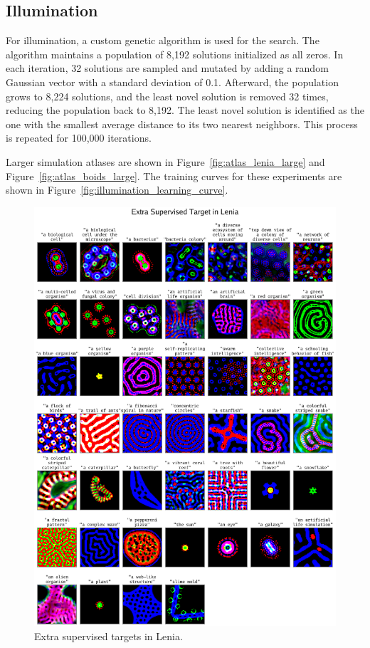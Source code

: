 \documentclass{article}
\begin{document}
\subsection{Illumination}

For illumination, a custom genetic algorithm is used for the search.
The algorithm maintains a population of 8,192 solutions initialized as all zeros.
In each iteration, 32 solutions are sampled and mutated by adding a random Gaussian vector with a standard deviation of 0.1.
Afterward, the population grows to 8,224 solutions, and the least novel solution is removed 32 times, reducing the population back to 8,192.
The least novel solution is identified as the one with the smallest average distance to its two nearest neighbors.
This process is repeated for 100,000 iterations.

Larger simulation atlases are shown in Figure~\ref{fig:atlas_lenia_large} and Figure~\ref{fig:atlas_boids_large}.
The training curves for these experiments are shown in Figure~\ref{fig:illumination_learning_curve}.





\newpage


\begin{figure}[ht]
    \centering
    \includegraphics[width=1.0\linewidth]{figs/supervised_extra_0_compressed.pdf}
    \caption{Extra supervised targets in Lenia.}
    \label{fig:supervised_extra_lenia}
\end{figure}
\end{document}
